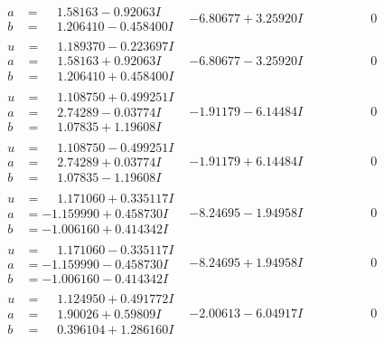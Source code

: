 \documentclass[1p]{elsarticle_modified}
\theoremstyle{definition}
\begin{document}
$$\begin{array}{c|c|c}
\begin{aligned}
a &= \phantom{-}1.58163 - 0.92063 I \\
b &= \phantom{-}1.206410 - 0.458400 I\end{aligned}
 & -6.80677 + 3.25920 I & \phantom{-0.000000 } 0 \\ \hline\begin{aligned}
u &= \phantom{-}1.189370 - 0.223697 I \\
a &= \phantom{-}1.58163 + 0.92063 I \\
b &= \phantom{-}1.206410 + 0.458400 I\end{aligned}
 & -6.80677 - 3.25920 I & \phantom{-0.000000 } 0 \\ \hline\begin{aligned}
u &= \phantom{-}1.108750 + 0.499251 I \\
a &= \phantom{-}2.74289 - 0.03774 I \\
b &= \phantom{-}1.07835 + 1.19608 I\end{aligned}
 & -1.91179 - 6.14484 I & \phantom{-0.000000 } 0 \\ \hline\begin{aligned}
u &= \phantom{-}1.108750 - 0.499251 I \\
a &= \phantom{-}2.74289 + 0.03774 I \\
b &= \phantom{-}1.07835 - 1.19608 I\end{aligned}
 & -1.91179 + 6.14484 I & \phantom{-0.000000 } 0 \\ \hline\begin{aligned}
u &= \phantom{-}1.171060 + 0.335117 I \\
a &= -1.159990 + 0.458730 I \\
b &= -1.006160 + 0.414342 I\end{aligned}
 & -8.24695 - 1.94958 I & \phantom{-0.000000 } 0 \\ \hline\begin{aligned}
u &= \phantom{-}1.171060 - 0.335117 I \\
a &= -1.159990 - 0.458730 I \\
b &= -1.006160 - 0.414342 I\end{aligned}
 & -8.24695 + 1.94958 I & \phantom{-0.000000 } 0 \\ \hline\begin{aligned}
u &= \phantom{-}1.124950 + 0.491772 I \\
a &= \phantom{-}1.90026 + 0.59809 I \\
b &= \phantom{-}0.396104 + 1.286160 I\end{aligned}
 & -2.00613 - 6.04917 I & \phantom{-0.000000 } 0 \\ \hline\begin{aligned}

\end{aligned}
\end{array}$$
\end{document}

